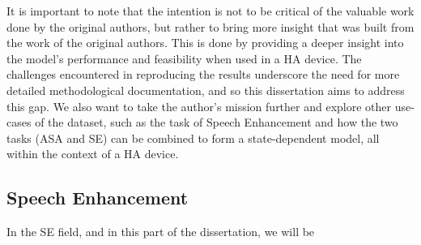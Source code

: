 \documentclass[logo,bsc,singlespacing,parskip,online]{infthesis}
\begin{document}
It is important to note that the intention is not to 
be critical of the valuable work done by the original authors, 
but rather to bring more insight that was built from the work of the original authors.
This is done by providing a deeper insight into the model's performance 
and feasibility when used in a HA device. The challenges encountered 
in reproducing the results underscore the need for more 
detailed methodological documentation, and so this dissertation aims 
to address this gap. We also want to take the author's 
mission further and explore other use-cases of the dataset, 
such as the task of Speech Enhancement and how the two tasks 
(ASA and SE) can be combined to form a state-dependent model,
all within the context of a HA device.

\subsection{Speech Enhancement}
In the SE field, and in this part of the dissertation, we will be 

\end{document}

